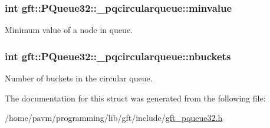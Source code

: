\hypertarget{structgft_1_1PQueue32_1_1__pqcircularqueue_a98c5d1ecaf33142d7eac03f97485d4d7}{
\subsubsection[{minvalue}]{\setlength{\rightskip}{0pt plus 5cm}int gft\-::\-P\-Queue32\-::\-\_\-pqcircularqueue\-::minvalue}}\label{structgft_1_1PQueue32_1_1__pqcircularqueue_a98c5d1ecaf33142d7eac03f97485d4d7}


Minimum value of a node in queue. 

\hypertarget{structgft_1_1PQueue32_1_1__pqcircularqueue_a622d6ecf851ae51f149bfd4cb8ba66e3}{
\subsubsection[{nbuckets}]{\setlength{\rightskip}{0pt plus 5cm}int gft\-::\-P\-Queue32\-::\-\_\-pqcircularqueue\-::nbuckets}}\label{structgft_1_1PQueue32_1_1__pqcircularqueue_a622d6ecf851ae51f149bfd4cb8ba66e3}


Number of buckets in the circular queue. 



The documentation for this struct was generated from the following file\-:\begin{DoxyCompactItemize}
\item 
/home/pavm/programming/lib/gft/include/\hyperlink{gft__pqueue32_8h}{gft\-\_\-pqueue32.\-h}\end{DoxyCompactItemize}
